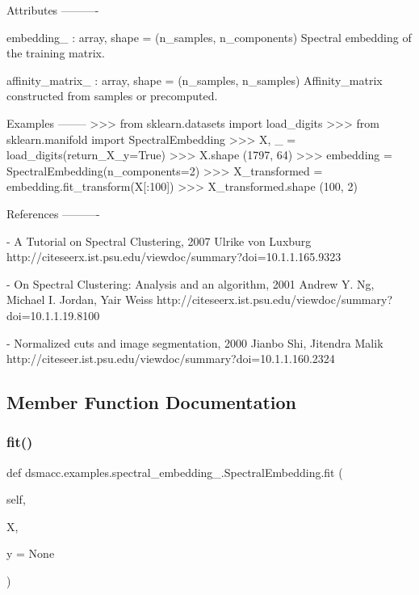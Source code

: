 \begin{DoxyVerb}
Attributes
----------

embedding_ : array, shape = (n_samples, n_components)
    Spectral embedding of the training matrix.

affinity_matrix_ : array, shape = (n_samples, n_samples)
    Affinity_matrix constructed from samples or precomputed.

Examples
--------
>>> from sklearn.datasets import load_digits
>>> from sklearn.manifold import SpectralEmbedding
>>> X, _ = load_digits(return_X_y=True)
>>> X.shape
(1797, 64)
>>> embedding = SpectralEmbedding(n_components=2)
>>> X_transformed = embedding.fit_transform(X[:100])
>>> X_transformed.shape
(100, 2)

References
----------

- A Tutorial on Spectral Clustering, 2007
  Ulrike von Luxburg
  http://citeseerx.ist.psu.edu/viewdoc/summary?doi=10.1.1.165.9323

- On Spectral Clustering: Analysis and an algorithm, 2001
  Andrew Y. Ng, Michael I. Jordan, Yair Weiss
  http://citeseerx.ist.psu.edu/viewdoc/summary?doi=10.1.1.19.8100

- Normalized cuts and image segmentation, 2000
  Jianbo Shi, Jitendra Malik
  http://citeseer.ist.psu.edu/viewdoc/summary?doi=10.1.1.160.2324
\end{DoxyVerb}
 

\subsection{Member Function Documentation}
\mbox{\label{classdsmacc_1_1examples_1_1spectral__embedding___1_1SpectralEmbedding_a0f599bc627028d8587bafb0f89f76e0b}} 
\subsubsection{\texorpdfstring{fit()}{fit()}}
{\footnotesize\ttfamily def dsmacc.\+examples.\+spectral\+\_\+embedding\+\_\+.\+Spectral\+Embedding.\+fit (\begin{DoxyParamCaption}\item[{}]{self,  }\item[{}]{X,  }\item[{}]{y = {\ttfamily None} }\end{DoxyParamCaption})}


